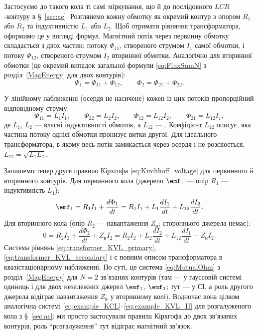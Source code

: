 Застосуємо до
такого кола ті самі міркування, що й до послідовного $LCR$-контуру
в \S~\ref{sec:ac}. Розглянемо кожну обмотку як окремий
контур з опором $R_1$ або $R_2$ та індуктивністю $L_1$ або $L_2$.
Щоб отримати рівняння трансформатора, оформимо це у вигляді
формул. Магнітний потік через первинну обмотку складається з
двох частин: потоку $\Phi_{11}$, створеного струмом $I_1$ самої
обмотки, і потоку $\Phi_{12}$, створеного струмом $I_2$
вторинної обмотки. Аналогічно для вторинної обмотки (це окремий
випадок загальної формули \eqref{eq:FluxSumN} з розділ~\ref{MagEnergy}
для двох контурів):
\begin{equation}\label{eq:transformer_fluxes}
	\Phi_1 = \Phi_{11} + \Phi_{12}, \qquad
	\Phi_2 = \Phi_{21} + \Phi_{22}.
\end{equation}

У лінійному наближенні (осердя не насичене) кожен із цих потоків
пропорційний відповідному струму:
\begin{equation}\label{eq:transformer_inductances}
	\Phi_{11} = L_1 I_1, \qquad
	\Phi_{22} = L_2 I_2, \qquad
	\Phi_{12} = L_{12} I_2, \qquad
	\Phi_{21} = L_{12} I_1,
\end{equation}
де $L_1$, $L_2$ --- власні індуктивності обмоток, а $L_{12}$ ---
. Коефіцієнт $L_{12}$ описує, яка
частина потоку однієї обмотки пронизує витки другої. Для
ідеального трансформатора, в якому весь потік замикається через
осердя і не розсіюється, $L_{12}=\sqrt{L_1L_2}$.

Запишемо тепер друге правило Кірхгофа \eqref{eq:Kirchhoff_voltage}
для первинного й вторинного контурів. Для первинного кола
(джерело $\emf_1$ --- опір $R_1$ --- індуктивність $L_1$):
\begin{equation}\label{eq:transformer_KVL_primary}
	\emf_1 = R_1 I_1 + \frac{d\Phi_1}{dt}
	       = R_1 I_1 + L_1\frac{dI_1}{dt} + L_{12}\frac{dI_2}{dt}.
\end{equation}
Для вторинного кола (опір $R_2$ --- навантаження $Z_{\text{н}}$; стороннього джерела немає):
\begin{equation}\label{eq:transformer_KVL_secondary}
	0 = R_2 I_2 + \frac{d\Phi_2}{dt} + Z_{\text{н}} I_2
	       = R_2 I_2 + L_2\frac{dI_2}{dt} + L_{12}\frac{dI_1}{dt}
	         + Z_{\text{н}} I_2.
\end{equation}
Система рівнянь \eqref{eq:transformer_KVL_primary},
\eqref{eq:transformer_KVL_secondary} і є повним описом
трансформатора в квазістаціонарному наближенні. По суті, це
система \eqref{eq:MutualOhm} з розділ~\ref{MagEnergy} для $N=2$
зв'язаних контурів (там --- у гауссовій системі одиниць і для
двох незалежних джерел $\emf_1$, $\emf_2$; тут --- у СІ, а роль
другого джерела відіграє навантаження $Z_{\text{н}}$ у
вторинному колі). Водночас вона цілком
аналогічна системі \eqref{eq:example_KCL}--\eqref{eq:example_KVL_II}
для розгалуженого кола з \S~\ref{sec:ac}: ми просто
застосували правила Кірхгофа до двох зв'язаних контурів, роль
\enquote{розгалуження} тут відіграє магнітний зв'язок.

